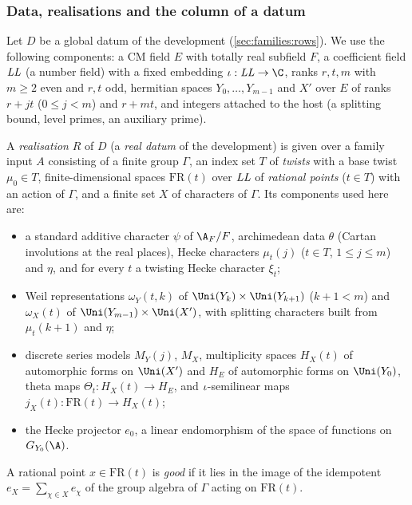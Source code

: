 \subsubsection{Data, realisations and the column of a datum}
Let $D$ be a global datum of the development (\cref{sec:families:rows}). We use the following components: a CM field
$E$ with totally real subfield $F$, a coefficient field $\mathit{LL}$ (a number field) with a fixed embedding
$\rowpropsemb:\rowpropsLL\to\C$, ranks $r,t,m$ with $m\ge2$ even and $r,t$ odd, hermitian spaces $Y_0,\dots,Y_{m-1}$ and
$X'$ over $E$ of ranks $r+jt$ ($0\le j<m$) and $r+mt$, and integers attached to the host (a splitting bound, level
primes, an auxiliary prime).

\begin{definition}\label{def:pf:rowprops:real}
A \emph{realisation} $R$ of $D$ (a \emph{real datum} of the development) is given over a family input $A$ consisting of
a finite group $\Gamma$, an index set $T$ of \emph{twists} with a base twist $\mu_0\in T$, finite-dimensional spaces
$\mathrm{FR}(t)$ over $\mathit{LL}$ of \emph{rational points} ($t\in T$) with an action of $\Gamma$, and a finite set $X$
of characters of $\Gamma$. Its components used here are:
\begin{itemize}
\item a standard additive character $\psi$ of $\A_F/F$, archimedean data $\theta$ (Cartan involutions at the real
places), Hecke characters $\mu_t(j)$ ($t\in T$, $1\le j\le m$) and $\eta$, and for every $t$ a twisting Hecke
character $\xi_t$;
\item Weil representations $\omega_Y(t,k)$ of $\Uni(Y_k)\times\Uni(Y_{k+1})$ ($k+1<m$) and $\omega_X(t)$ of
$\Uni(Y_{m-1})\times\Uni(X')$, with splitting characters built from $\mu_t(k+1)$ and $\eta$;
\item discrete series models $M_Y(j)$, $M_X$, multiplicity spaces $H_X(t)$ of automorphic forms on $\Uni(X')$ and $H_E$
of automorphic forms on $\Uni(Y_0)$, theta maps $\Theta_t:H_X(t)\to H_E$, and $\iota$-semilinear maps
$j_X(t):\mathrm{FR}(t)\to H_X(t)$;
\item the Hecke projector $e_0$, a linear endomorphism of the space of functions on $G_{Y_0}(\A)$.
\end{itemize}
A rational point $x\in\mathrm{FR}(t)$ is \emph{good} if it lies in the image of the idempotent
$e_X=\sum_{\chi\in X}e_\chi$ of the group algebra of $\Gamma$ acting on $\mathrm{FR}(t)$.
\end{definition}

